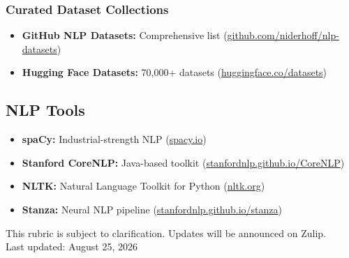 \documentclass[10pt,letterpaper]{article}
\begin{document}
\subsubsection{Curated Dataset Collections}
\begin{itemize}
  \item \textbf{GitHub NLP Datasets:} Comprehensive list (\href{https://github.com/niderhoff/nlp-datasets}{github.com/niderhoff/nlp-datasets})
\end{itemize}

\begin{itemize}
  \item \textbf{Hugging Face Datasets:} 70,000+ datasets (\href{https://huggingface.co/datasets}{huggingface.co/datasets})
\end{itemize}

\subsection{NLP Tools}
\begin{itemize}
  \item \textbf{spaCy:} Industrial-strength NLP (\href{https://spacy.io/}{spacy.io})
  \item \textbf{Stanford CoreNLP:} Java-based toolkit (\href{https://stanfordnlp.github.io/CoreNLP/}{stanfordnlp.github.io/CoreNLP})
  \item \textbf{NLTK:} Natural Language Toolkit for Python (\href{https://www.nltk.org/}{nltk.org})
  \item \textbf{Stanza:} Neural NLP pipeline (\href{https://stanfordnlp.github.io/stanza/}{stanfordnlp.github.io/stanza})
\end{itemize}

\begin{center}
\scriptsize\color{darkgray}
This rubric is subject to clarification. Updates will be announced on Zulip.\\
Last updated: August 25, 2026
\end{center}
\end{document}
